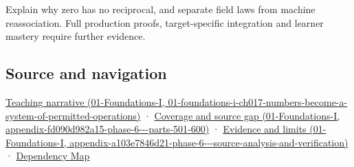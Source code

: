 Explain why zero has no reciprocal, and separate field laws from machine reassociation. Full production proofs, target-specific integration and learner mastery require further evidence.

\subsection{Source and navigation}\label{appendix-52051ad550fe-source-and-navigation}

\href{../01-Foundations-I/main.pdf\#nameddest=01-foundations-i-ch017-numbers-become-a-system-of-permitted-operations}{Teaching narrative (01-Foundations-I, 01-foundations-i-ch017-numbers-become-a-system-of-permitted-operations)} · \href{../01-Foundations-I/main.pdf\#nameddest=appendix-fd090d982a15-phase-6---parts-501-600}{Coverage and source gap (01-Foundations-I, appendix-fd090d982a15-phase-6-\/-\/-parts-501-600)} · \href{../01-Foundations-I/main.pdf\#nameddest=appendix-a103e7846d21-phase-6---source-analysis-and-verification}{Evidence and limits (01-Foundations-I, appendix-a103e7846d21-phase-6-\/-\/-source-analysis-and-verification)} · \hyperref[appendix-4ad47bdd269a]{Dependency Map}
